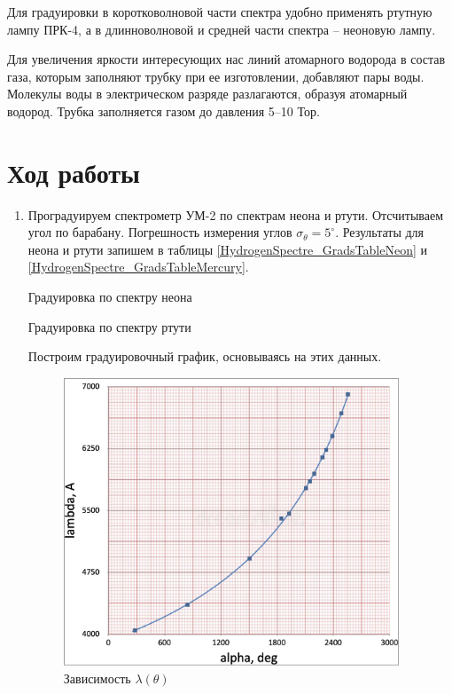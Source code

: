 \documentclass[12pt,a4paper]{article}
\begin{document}
	Для градуировки в коротковолновой части спектра удобно применять ртутную лампу ПРК-4, а в длинноволновой и средней части спектра -- неоновую лампу. 
	
	Для увеличения яркости интересующих нас линий атомарного водорода в состав газа, которым заполняют трубку при ее изготовлении, добавляют пары воды. Молекулы воды в электрическом разряде разлагаются, образуя атомарный водород. Трубка заполняется газом до давления 5–10 Тор.

	
    \section*{Ход работы}
	

 \begin{enumerate}
 
    \item Проградуируем спектрометр УМ-2 по спектрам неона и ртути. Отсчитываем угол по барабану. Погрешность измерения углов $\sigma_{\theta} = 5^\circ$. Результаты для неона и ртути запишем в таблицы \ref{HydrogenSpectre_GradsTableNeon} и \ref{HydrogenSpectre_GradsTableMercury}.

    \begin{table}[h!]
       \centering
       \footnotesize
       
       \caption{Градуировка по спектру неона}
       \label{HydrogenSpectre_GradsTableNeon}
    \end{table}

    \begin{table}[h!]
       \centering
       \footnotesize
       
       \caption{Градуировка по спектру ртути}
       \label{HydrogenSpectre_GradsTableMercury}
    \end{table}

    Построим градуировочный график, основываясь на этих данных.

		
    \begin{figure}[h!]
        \centering
        \includegraphics[width=10cm]{src/plotApprox.png}
        \caption{Зависимость $\lambda(\theta)$}
    \end{figure}


\end{enumerate}
\end{document}
